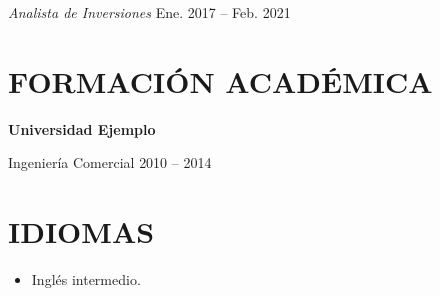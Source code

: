 \documentclass[10pt,a4paper]{article}
\newcommand{\entidad}[2]{%
    \noindent
    \textbf{#1}\hfill
    {\small\color{secundario}#2}\par
}
\newcommand{\cargo}[2]{%
    \noindent
    \textit{#1}\enspace
    {\small\color{secundario}#2}\par
}
\newcommand{\programa}[2]{%
    \noindent
    #1\enspace
    {\small\color{secundario}#2}\par
}
\begin{document}
\vspace{3pt}

\cargo{Analista de Inversiones}{Ene. 2017 -- Feb. 2021}

\section{FORMACIÓN ACADÉMICA}

\entidad{Universidad Ejemplo}{}
\programa{Ingeniería Comercial}{2010 -- 2014}

\section{IDIOMAS}

\begin{itemize}
    \item Inglés intermedio.
\end{itemize}
\end{document}
